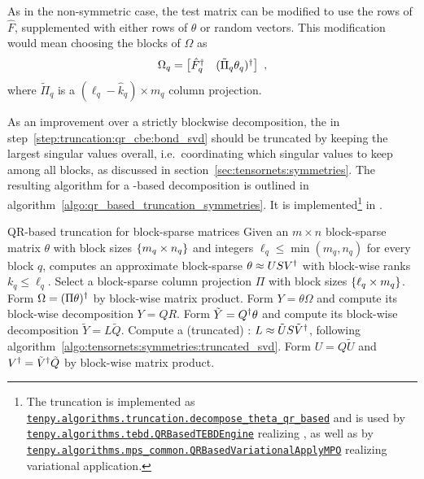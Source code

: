 As in the non-symmetric case, the test matrix can be modified to use the rows of $\hat{F}$, supplemented with either rows of $\theta$ or random vectors.
%
This modification would mean choosing the blocks of $\Omega$ as
\begin{equation}
    \Omega_q = \begin{bmatrix} \hat{F}_q^\dagger & (\tilde{\Pi}_q \theta_q)^\dagger \end{bmatrix}
    ~,
\end{equation}
where $\tilde{\Pi}_q$ is a $(\ell_q - \hat{k}_q) \times m_q$ column projection.

As an improvement over a strictly blockwise decomposition, the  in step~\ref{step:truncation:qr_cbe:bond_svd} should be truncated by keeping the largest singular values overall, i.e.~coordinating which singular values to keep among all blocks, as discussed in section~\ref{sec:tensornets:symmetries}.
%
The resulting algorithm for a -based decomposition is outlined in algorithm~\ref{algo:qr_based_truncation_symmetries}.
%
It is implemented\footnote{
    The truncation is implemented as \href{https://tenpy.readthedocs.io/en/latest/reference/tenpy.algorithms.truncation.decompose_theta_qr_based.html}{\texttt{tenpy.algorithms.truncation.decompose\_theta\_qr\_based}} and is used by \href{https://tenpy.readthedocs.io/en/latest/reference/tenpy.algorithms.tebd.QRBasedTEBDEngine.html}{\texttt{tenpy.algorithms.tebd.QRBasedTEBDEngine}} realizing , as well as by \href{https://tenpy.readthedocs.io/en/latest/reference/tenpy.algorithms.mps_common.QRBasedVariationalApplyMPO.html}{\texttt{tenpy.algorithms.mps\_common.QRBasedVariationalApplyMPO}} realizing variational  application.
} in .


\begin{Algorithm}{QR-based truncation for block-sparse matrices}{
    Given an $m \times n$ block-sparse matrix $\theta$ with block sizes $\set{m_q \times n_q}$ and integers $\ell_q \leq \min(m_q,n_q)$ for every block $q$,
    computes an approximate block-sparse  $\theta \approx U S V^\dagger$ with block-wise ranks $k_q \leq \ell_q$.
    \label{algo:qr_based_truncation_symmetries}
}
    \step Select a block-sparse column projection $\Pi$ with block sizes $\set{\ell_q \times m_q}$.
    \step Form $\Omega = (\Pi \theta)^\dagger$ by block-wise matrix product.
    \step Form $Y = \theta \Omega$ and compute its block-wise  decomposition $Y = Q R$.
    \step Form $\tilde Y = Q^\dagger \theta$ and compute its block-wise  decomposition $\tilde Y = L \tilde Q$.
    \step Compute a (truncated) : $L \approx \tilde U S \tilde V^\dagger$, following algorithm~\ref{algo:tensornets:symmetries:truncated_svd}.
    \step Form $U = Q \tilde U$ and $V^\dagger = \tilde V^\dagger \tilde Q$ by block-wise matrix product.
\end{Algorithm}

